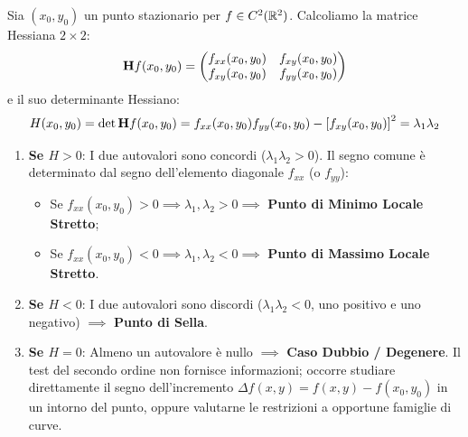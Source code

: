 \begin{metodo}
Sia $(x_0, y_0)$ un punto stazionario per $f \in C^2(\mathbb{R}^2)$. Calcoliamo la matrice Hessiana $2 \times 2$:
\[
\mathbf{H} f(x_0, y_0) = \begin{pmatrix} f_{xx}(x_0, y_0) & f_{xy}(x_0, y_0) \\ f_{xy}(x_0, y_0) & f_{yy}(x_0, y_0) \end{pmatrix}
\]
e il suo determinante Hessiano:
\[
H(x_0, y_0) = \det \mathbf{H} f(x_0, y_0) = f_{xx}(x_0, y_0) f_{yy}(x_0, y_0) - \left[ f_{xy}(x_0, y_0) \right]^2 = \lambda_1 \lambda_2
\]
\begin{enumerate}
    \item \textbf{Se $H > 0$}: I due autovalori sono concordi ($\lambda_1 \lambda_2 > 0$). Il segno comune è determinato dal segno dell'elemento diagonale $f_{xx}$ (o $f_{yy}$):
    \begin{itemize}
        \item Se $f_{xx}(x_0, y_0) > 0 \implies \lambda_1, \lambda_2 > 0 \implies$ \textbf{Punto di Minimo Locale Stretto};
        \item Se $f_{xx}(x_0, y_0) < 0 \implies \lambda_1, \lambda_2 < 0 \implies$ \textbf{Punto di Massimo Locale Stretto}.
    \end{itemize}
    \item \textbf{Se $H < 0$}: I due autovalori sono discordi ($\lambda_1 \lambda_2 < 0$, uno positivo e uno negativo) $\implies$ \textbf{Punto di Sella}.
    \item \textbf{Se $H = 0$}: Almeno un autovalore è nullo $\implies$ \textbf{Caso Dubbio / Degenere}.
    Il test del secondo ordine non fornisce informazioni; occorre studiare direttamente il segno dell'incremento $\Delta f(x,y) = f(x,y) - f(x_0,y_0)$ in un intorno del punto, oppure valutarne le restrizioni a opportune famiglie di curve.
\end{enumerate}
\end{metodo}

\begin{center}
\end{center}

